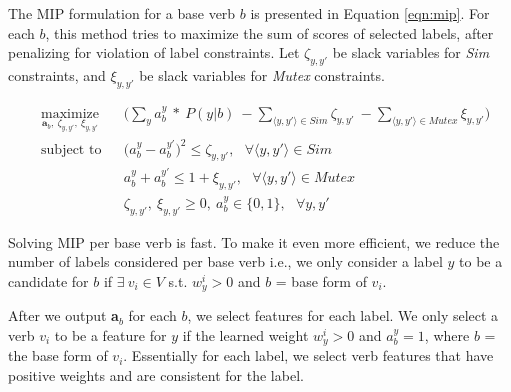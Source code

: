 The MIP formulation for a base verb $b$ is presented in Equation \ref{eqn:mip}. For each $b$, this method tries to maximize the sum of scores of selected labels, after penalizing for violation of label constraints. Let $\zeta_{y, y'}$ be slack variables for \textit{Sim} constraints, and $\xi_{y, y'}$ be slack variables for \textit{Mutex} constraints. 

\scriptsize
\begin{equation}
\begin{aligned}
& \operatorname*{maximize}_{\textbf{a}_b,\ \zeta_{y, y'},\ \xi_{y, y'}}
& & \bigg( \sum_{y} a_{b}^{y}\ *\ P(y | b)\ - \sum_{\langle y, y'\rangle \in Sim} \zeta_{y, y'}\ - \sum_{\langle y, y'\rangle \in Mutex} \xi_{y, y'}\bigg) \\ 
& \text{subject to} & & \big(a_{b}^{y} - a_{b}^{y'}\big)^2 \leq \zeta_{y, y'},\ \ \ \forall \langle y, y'\rangle \in Sim \\
& & & a_{b}^{y} + a_{b}^{y'} \leq 1 + \xi_{y, y'},\ \ \ \forall \langle y, y'\rangle \in Mutex \\
& & & \zeta_{y, y'},\ \xi_{y, y'} \geq 0,\ a_{b}^{y} \in \{0, 1\},\ \ \ \forall y, y'
\label{eqn:mip}
\end{aligned}
\end{equation}
\normalsize

Solving MIP per base verb is fast. To make it even more efficient, we reduce the number of labels considered per base verb i.e., we only consider a label $y$ to be a candidate for $b$ if $\exists\ v_i \in V$ s.t. $w_y^i > 0$ and $b$ = base form of $v_i$. %

After we output \textbf{a}$_b$ for each $b$, we select features for each label. We only select a verb $v_i$ to be a feature for $y$ if the learned weight $w_y^i > 0$ and $a_b^{y} = 1$, where $b$ = the base form of $v_i$. Essentially for each label, we select verb features that have positive weights and are consistent for the label.